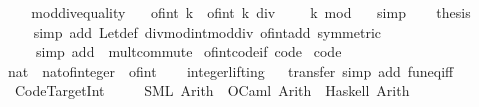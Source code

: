 \begin{isabellebody}
\isamarkupfalse%
\ {\isacharminus}\isanewline
\ \ \isamarkupfalse%
\ mod{\isacharunderscore}div{\isacharunderscore}equality\ \isamarkupfalse%
\ {\isacharasterisk}{\isacharcolon}\ {\isachardoublequoteopen}of{\isacharunderscore}int\ k\ {\isacharequal}\ of{\isacharunderscore}int\ {\isacharparenleft}k\ div\ {}\ {\isacharasterisk}\ {}\ {\isacharplus}\ k\ mod\ {}{\isacharparenright}{\isachardoublequoteclose}\ \isamarkupfalse%
\ simp\isanewline
\ \ \isamarkupfalse%
\ {\isacharquery}thesis\isanewline
\ \ \ \ \isamarkupfalse%
\ {\isacharparenleft}simp\ add{\isacharcolon}\ Let{\isacharunderscore}def\ divmod{\isacharunderscore}int{\isacharunderscore}mod{\isacharunderscore}div\ of{\isacharunderscore}int{\isacharunderscore}add\ {\isacharbrackleft}symmetric{\isacharbrackright}{\isacharparenright}\isanewline
\ \ \ \ \ \ {\isacharparenleft}simp\ add{\isacharcolon}\ {\isacharasterisk}\ mult{\isachardot}commute{\isacharparenright}\isanewline
{}\isamarkupfalse%
%
\endisatagproof
{\isafoldproof}%
%
\isadelimproof
\isanewline
%
\endisadelimproof
\isanewline
{}\isamarkupfalse%
\ of{\isacharunderscore}int{\isacharunderscore}code{\isacharunderscore}if\ {\isacharbrackleft}code{\isacharbrackright}\isanewline
\isanewline
{}\isamarkupfalse%
\ {\isacharbrackleft}code{\isacharbrackright}{\isacharcolon}\isanewline
\ \ {\isachardoublequoteopen}nat\ {\isacharequal}\ nat{\isacharunderscore}of{\isacharunderscore}integer\ {\isasymcirc}\ of{\isacharunderscore}int{\isachardoublequoteclose}\isanewline
\ \ \isamarkupfalse%
\ integer{\isachardot}lifting%
\isadelimproof
\ %
\endisadelimproof
%
\isatagproof
{}\isamarkupfalse%
\ transfer\ {\isacharparenleft}simp\ add{\isacharcolon}\ fun{\isacharunderscore}eq{\isacharunderscore}iff{\isacharparenright}%
\endisatagproof
{\isafoldproof}%
%
\isadelimproof
%
\endisadelimproof
\isanewline
\isanewline
{}\isamarkupfalse%
\isanewline
\ \ \ Code{\isacharunderscore}Target{\isacharunderscore}Int\ {\isasymrightharpoonup}\isanewline
\ \ \ \ {\isacharparenleft}SML{\isacharparenright}\ Arith\ \ {\isacharparenleft}OCaml{\isacharparenright}\ Arith\ \ {\isacharparenleft}Haskell{\isacharparenright}\ Arith\isanewline
%
\isadelimtheory
\isanewline
%
\endisadelimtheory
%
\isatagtheory
{}\isamarkupfalse%
%
\endisatagtheory
{\isafoldtheory}%
%
\isadelimtheory
%
\endisadelimtheory
\end{isabellebody}%
